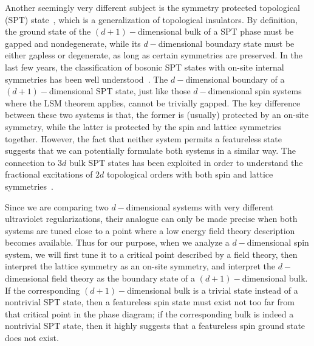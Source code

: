 \documentclass[aps,prb,twocolumn,superscriptaddress,showpacs]{revtex4}
\begin{document}
Another seemingly very different subject is the symmetry protected
topological (SPT) state~\cite{wenspt,wenspt2}, which is a
generalization of topological insulators. By definition, the
ground state of the $(d+1)-$dimensional bulk of a SPT phase must
be gapped and nondegenerate, while its $d-$dimensional boundary
state must be either gapless or degenerate, as long as certain
symmetries are preserved. In the last few years, the
classification of bosonic SPT states with on-site internal
symmetries has been well
understood~\cite{wenspt,wenspt2,senthilashvin,xuclass,kapustin1,kapustin4,freed1,freed2,wenso,bixu}.
The $d-$dimensional boundary of a $(d+1)-$dimensional SPT state,
just like those $d-$dimensional spin systems where the LSM theorem
applies, cannot be trivially gapped. The key difference between
these two systems is that, the former is (usually) protected by an
on-site symmetry, while the latter is protected by the spin and
lattice symmetries together. However, the fact that neither system
permits a featureless state suggests that we can potentially
formulate both systems in a similar way. The connection to $3d$
bulk SPT states has been exploited in order to understand the
fractional excitations of $2d$ topological orders with both spin
and lattice symmetries~\cite{menglsm}.


Since we are comparing two $d-$dimensional systems with very
different ultraviolet regularizations, their analogue can only be
made precise when both systems are tuned close to a point where a
low energy field theory description becomes available.
Thus for our purpose, when we analyze a $d-$dimensional spin
system, we will first tune it to a critical point described by a
field theory, then interpret the lattice symmetry as an on-site
symmetry, and interpret the $d-$dimensional field theory as the
boundary state of a $(d+1)-$dimensional bulk. If the corresponding
$(d+1)-$dimensional bulk is a trivial state instead of a
nontrivial SPT state, then a featureless spin state must exist not
too far from that critical point in the phase diagram; if the
corresponding bulk is indeed a nontrivial SPT state, then it
highly suggests that a featureless spin ground state does not
exist.
\end{document}
